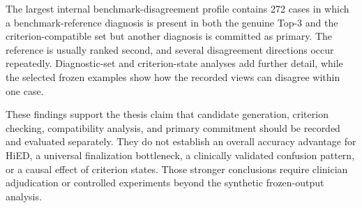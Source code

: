 The largest internal benchmark-disagreement profile contains 272 cases in which a benchmark-reference diagnosis is present in both the genuine Top-3 and the criterion-compatible set but another diagnosis is committed as primary. The reference is usually ranked second, and several disagreement directions occur repeatedly. Diagnostic-set and criterion-state analyses add further detail, while the selected frozen examples show how the recorded views can disagree within one case.

These findings support the thesis claim that candidate generation, criterion checking, compatibility analysis, and primary commitment should be recorded and evaluated separately. They do not establish an overall accuracy advantage for HiED, a universal finalization bottleneck, a clinically validated confusion pattern, or a causal effect of criterion states. Those stronger conclusions require clinician adjudication or controlled experiments beyond the synthetic frozen-output analysis.
